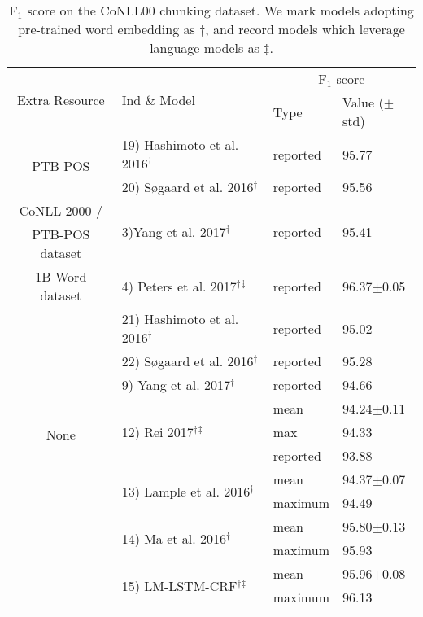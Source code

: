 \documentclass[letterpaper]{article} \usepackage{aaai18}  \usepackage{times}  \usepackage{helvet}  \usepackage{courier}  \usepackage{url}  \usepackage{graphicx}  \usepackage{multirow}
\newcommand{\our}{\textsc{LM-LSTM-CRF}\xspace}
\begin{document}
\begin{table}
\center
\scalebox{0.7}
{
\begin{tabular}{c||l|l|l}
\hline
\multirow{2}{*}{Extra Resource} & \multirow{2}{*}{Ind \& Model} & \multicolumn{2}{|c}{F$_1$ score}\\
\cline{3-4}
 & & Type & Value ($\pm$std)\\
\hline
\hline
\multirow{2}{*}{PTB-POS} & \nocite{hashimoto2016joint}19) Hashimoto et al. 2016$^\dagger$ & reported& 95.77\\
\cline{2-4}
& \nocite{sogaard2016deep}20) S{\o}gaard et al. 2016$^\dagger$& reported & 95.56 \\
\hline
CoNLL 2000 / & \multirow{2}{*}{3)Yang et al. 2017$^\dagger$} & \multirow{2}{*}{reported} & \multirow{2}{*}{95.41} \\
PTB-POS dataset & & & \\
\hline
1B Word dataset &4) Peters et al. 2017$^\dagger$$^\ddagger$ & reported & 96.37$\pm$0.05 \\
\hline
\hline
\multirow{10}{*}{None} & \nocite{hashimoto2016joint}21) Hashimoto et al. 2016$^\dagger$ & reported& 95.02 \\
\cline{2-4}
& \nocite{sogaard2016deep}22) S{\o}gaard et al. 2016$^\dagger$& reported & 95.28 \\
\cline{2-4}
&9) Yang et al. 2017$^\dagger$ & reported & 94.66\\
\cline{2-4}
& \multirow{3}{*}{12) Rei 2017$^\dagger$$^\ddagger$} & mean & 94.24$\pm$0.11\\
\cline{3-4}
& & max & 94.33\\
\cline{3-4}
& & reported & 93.88\\
\cline{2-4}
& \multirow{2}{*}{13) Lample et al. 2016$^\dagger$} & mean & 94.37$\pm$0.07\\
\cline{3-4}
& & maximum & 94.49\\
\cline{2-4}
& \multirow{2}{*}{14) Ma et al. 2016$^\dagger$} & mean & 95.80$\pm$0.13\\
\cline{3-4}
& & maximum & 95.93\\
\cline{2-4}
& \multirow{2}{*}{15) \our$^\dagger$$^\ddagger$} & mean & 95.96$\pm$0.08\\
\cline{3-4}
& & maximum & 96.13\\
\hline
\end{tabular}
}
\caption{F$_1$ score on the CoNLL00 chunking dataset. 
We mark models adopting pre-trained word embedding as $\dagger$, and record models which leverage language models as $\ddagger$.
}\label{tbl:chunking}
\end{table}
\end{document}
